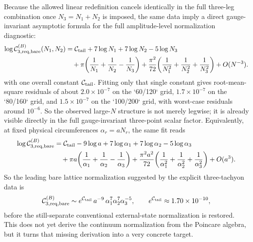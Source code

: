 \documentclass[11pt]{article}
\numberwithin{equation}{section}
\begin{document}
Because the allowed linear redefinition cancels identically in the full three-leg combination once $N_3=N_1+N_2$ is imposed, the same data imply a direct gauge-invariant asymptotic formula for the full amplitude-level normalization diagnostic:
\begin{equation}
\label{eq:s12-1-035}
\begin{aligned}
\log {\cal C}^{(B)}_{3,\mathrm{req,bare}}(N_1,N_2)
&=
{\cal C}_{\mathrm{tail}}
+7\log N_1+7\log N_2-5\log N_3\\
&\quad
+\pi\!\left(\frac1{N_1}+\frac1{N_2}-\frac1{N_3}\right)
+\frac{\pi^2}{72}\!\left(\frac1{N_1^2}+\frac1{N_2^2}+\frac1{N_3^2}\right)
+O(N^{-3}) .
\end{aligned}
\end{equation}
with one overall constant ${\cal C}_{\mathrm{tail}}$. Fitting only that single constant gives root-mean-square residuals of about $2.0\times 10^{-7}$ on the `60/120` grid, $1.7\times 10^{-7}$ on the `80/160` grid, and $1.5\times 10^{-7}$ on the `100/200` grid, with worst-case residuals around $10^{-6}$. So the observed large-$N$ structure is not merely legwise; it is already visible directly in the full gauge-invariant three-point scalar factor.
Equivalently, at fixed physical circumferences $\alpha_r=aN_r$, the same fit reads
\begin{equation}
\label{eq:s12-1-036}
\begin{aligned}
\log {\cal C}^{(B)}_{3,\mathrm{req,bare}}
&=
{\cal C}_{\mathrm{tail}}
-9\log a
+7\log \alpha_1
+7\log \alpha_2
-5\log \alpha_3\\
&\quad
+\pi a\!\left(\frac1{\alpha_1}+\frac1{\alpha_2}-\frac1{\alpha_3}\right)
+\frac{\pi^2 a^2}{72}\!\left(\frac1{\alpha_1^2}+\frac1{\alpha_2^2}+\frac1{\alpha_3^2}\right)
+O(a^3).
\end{aligned}
\end{equation}
So the leading bare lattice normalization suggested by the explicit three-tachyon data is
\begin{equation}
\label{eq:s12-1-037}
{\cal C}^{(B)}_{3,\mathrm{req,bare}}
\sim
e^{{\cal C}_{\mathrm{tail}}}\,
a^{-9}\,
\alpha_1^7\alpha_2^7\alpha_3^{-5},
\qquad
e^{{\cal C}_{\mathrm{tail}}}\approx 1.70\times 10^{-10},
\end{equation}
before the still-separate conventional external-state normalization is restored. This does not yet derive the continuum normalization from the Poincare algebra, but it turns that missing derivation into a very concrete target.
\end{document}
